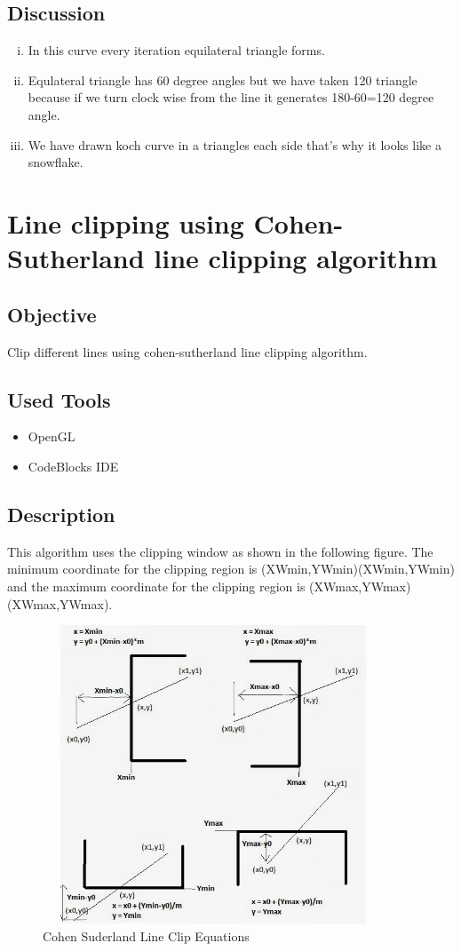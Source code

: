 \documentclass[11pt]{report}
\begin{document}
\section{Discussion}
\begin{enumerate}[(i)]
	\item In this curve every iteration equilateral triangle forms. 
	\item Equlateral triangle has 60 degree angles but we have taken 120 triangle because if we turn clock wise from the line it generates 180-60=120 degree angle.
	\item We have drawn koch curve in a triangles each side that's why it looks like a snowflake.
\end{enumerate}

\chapter{Line clipping using Cohen-Sutherland line clipping algorithm}
\section{Objective}
Clip different lines using cohen-sutherland line clipping algorithm.
\section{Used Tools}
\begin{itemize}
	\item OpenGL
	\item CodeBlocks IDE
\end{itemize}

\section{Description}
This algorithm uses the clipping window as shown in the following figure. The minimum coordinate for the clipping region is (XWmin,YWmin)(XWmin,YWmin) and the maximum coordinate for the clipping region is (XWmax,YWmax)(XWmax,YWmax).
\newline
\begin{figure}[!htb]
	\centering
	\includegraphics[height=3.5in,width=4in]{blogpic}
	\caption{Cohen Suderland Line Clip Equations}
\end{figure}
\end{document}
